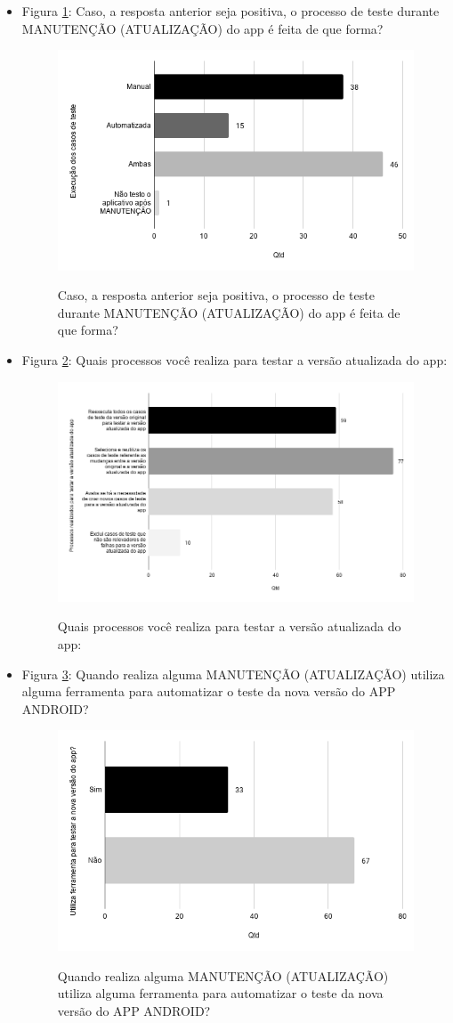 \begin{itemize}
    
    \item Figura \ref{figure:s_formatestemanutencao}: Caso, a resposta anterior seja positiva, o processo de teste durante MANUTENÇÃO (ATUALIZAÇÃO) do app é feita de que forma?
    \begin{figure}[!htb]
    \centering
    \includegraphics[width=.55\textwidth]{images/s_formatestemanutencao.png}
    \label{figure:s_formatestemanutencao}
    \caption{Caso, a resposta anterior seja positiva, o processo de teste durante MANUTENÇÃO (ATUALIZAÇÃO) do app é feita de que forma?}
    \end{figure}     
    
    
    \item Figura \ref{figure:s_processostestemanutencao}: Quais processos você realiza para testar a versão atualizada do app:
    \begin{figure}[!htb]
    \centering
    \includegraphics[width=.55\textwidth]{images/s_processostestemanutencao.png}
    \label{figure:s_processostestemanutencao}
    \caption{Quais processos você realiza para testar a versão atualizada do app:}
    \end{figure} 
    
    
    \item Figura \ref{figure:s_testenovo}: Quando realiza alguma MANUTENÇÃO (ATUALIZAÇÃO) utiliza alguma ferramenta para automatizar o teste da nova versão do APP ANDROID?
    \begin{figure}[!htb]
    \centering
    \includegraphics[width=.55\textwidth]{images/s_testenovo.png}
    \label{figure:s_testenovo}
    \caption{Quando realiza alguma MANUTENÇÃO (ATUALIZAÇÃO) utiliza alguma ferramenta para automatizar o teste da nova versão do APP ANDROID?}
    \end{figure}
    

\end{itemize}
